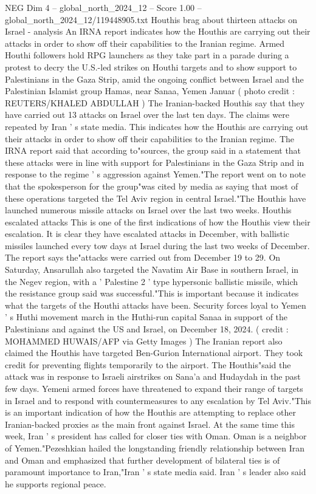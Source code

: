\begin{textsample}{NEG Dim 4 – global\_north\_2024\_12 – Score 1.00 – global\_north\_2024\_12/119448905.txt}  \label{ex:f4_neg_155}
Houthis brag about thirteen attacks on Israel - analysis An IRNA report indicates how the Houthis are carrying out their attacks in order to show off their capabilities to the Iranian regime.
Armed Houthi followers hold RPG launchers as they take part in a parade during a protest to decry the U.S.-led strikes on Houthi targets and to show support to Palestinians in the Gaza Strip, amid the ongoing conflict between Israel and the Palestinian Islamist group Hamas, near Sanaa, Yemen Januar ( photo credit : REUTERS/KHALED ABDULLAH ) The Iranian-backed Houthis say that they have carried out 13 attacks on Israel over the last ten days.
The claims were repeated by Iran ' s state media.
This indicates how the Houthis are carrying out their attacks in order to show off their capabilities to the Iranian regime.
The IRNA report said that according to"sources, the group said in a statement that these attacks were in line with support for Palestinians in the Gaza Strip and in response to the regime ' s aggression against Yemen."The report went on to note that the spokesperson for the group"was cited by media as saying that most of these operations targeted the Tel Aviv region in central Israel."The Houthis have launched numerous missile attacks on Israel over the last two weeks.
Houthis escalated attacks This is one of the first indications of how the Houthis view their escalation.
It is clear they have escalated attacks in December, with ballistic missiles launched every tow days at Israel during the last two weeks of December.
The report says the"attacks were carried out from December 19 to 29.
On Saturday, Ansarullah also targeted the Navatim Air Base in southern Israel, in the Negev region, with a ' Palestine 2 ' type hypersonic ballistic missile, which the resistance group said was successful."This is important because it indicates what the targets of the Houthi attacks have been.
Security forces loyal to Yemen ' s Huthi movement march in the Huthi-run capital Sanaa in support of the Palestinians and against the US and Israel, on December 18, 2024. ( credit : MOHAMMED HUWAIS/AFP via Getty Images ) The Iranian report also claimed the Houthis have targeted Ben-Gurion International airport.
They took credit for preventing flights temporarily to the airport.
The Houthis"said the attack was in response to Israeli airstrikes on Sana'a and Hudaydah in the past few days.
Yemeni armed forces have threatened to expand their range of targets in Israel and to respond with countermeasures to any escalation by Tel Aviv."This is an important indication of how the Houthis are attempting to replace other Iranian-backed proxies as the main front against Israel.
At the same time this week, Iran ' s president has called for closer ties with Oman.
Oman is a neighbor of Yemen."Pezeshkian hailed the longstanding friendly relationship between Iran and Oman and emphasized that further development of bilateral ties is of paramount importance to Iran,"Iran ' s state media said.
Iran ' s leader also said he supports regional peace.

\end{textsample}
